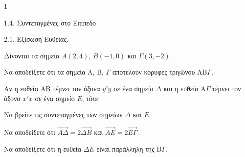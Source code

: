 \begin{ylh}{1}
    \item 1.4. Συντεταγμένες στο Επίπεδο
    \item 2.1. Εξίσωση Ευθείας.
\end{ylh}
Δίνονται τα σημεία $A(2,4)$, $B(-1,0)$ και $\Gamma(3,-2)$.
\begin{alist}
\item Να αποδείξετε ότι τα σημεία A, B, $\Gamma$ αποτελούν κορυφές τριγώνου ΑΒ$\Gamma$. 
\item Αν η ευθεία ΑΒ τέμνει τον άξονα $y'y$ σε ένα σημείο $\Delta$ και η ευθεία Α$\Gamma$ τέμνει τον άξονα $x'x$ σε ένα σημείο $E$, τότε:
    \begin{rlist}
    \item Να βρείτε τις συντεταγμένες των σημείων $\Delta$ και $E$. 
    \item Να αποδείξετε ότι $\vec{A\Delta} = 2\vec{\Delta B}$ και $\vec{AE} = 2\vec{E\Gamma}$. 
    \end{rlist}
\item Να αποδείξετε ότι η ευθεία $\Delta E$ είναι παράλληλη της B$\Gamma$. 
\end{alist}